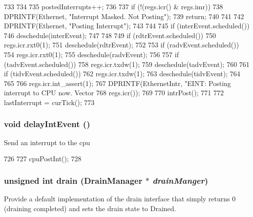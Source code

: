\begin{DoxyCode}
733 {
734 
735     postedInterrupts++;
736 
737     if (!(regs.icr() & regs.imr)) {
738         DPRINTF(Ethernet, "Interrupt Masked. Not Posting\n");
739         return;
740     }
741 
742     DPRINTF(Ethernet, "Posting Interrupt\n");
743 
744 
745     if (interEvent.scheduled()) {
746         deschedule(interEvent);
747     }
748 
749     if (rdtrEvent.scheduled()) {
750         regs.icr.rxt0(1);
751         deschedule(rdtrEvent);
752     }
753     if (radvEvent.scheduled()) {
754         regs.icr.rxt0(1);
755         deschedule(radvEvent);
756     }
757     if (tadvEvent.scheduled()) {
758         regs.icr.txdw(1);
759         deschedule(tadvEvent);
760     }
761     if (tidvEvent.scheduled()) {
762         regs.icr.txdw(1);
763         deschedule(tidvEvent);
764     }
765 
766     regs.icr.int_assert(1);
767     DPRINTF(EthernetIntr, "EINT: Posting interrupt to CPU now. Vector %
768             regs.icr());
769 
770     intrPost();
771 
772     lastInterrupt = curTick();
773 }
\end{DoxyCode}
\hypertarget{classIGbE_a671c460437037741ca81581773939a28}{
\subsubsection[{delayIntEvent}]{\setlength{\rightskip}{0pt plus 5cm}void delayIntEvent ()}}
\label{classIGbE_a671c460437037741ca81581773939a28}
Send an interrupt to the cpu 


\begin{DoxyCode}
726 {
727     cpuPostInt();
728 }
\end{DoxyCode}
\hypertarget{classIGbE_aa8a18d230dba7a674ac8a0b4f35bc36a}{
\subsubsection[{drain}]{\setlength{\rightskip}{0pt plus 5cm}unsigned int drain ({\bf DrainManager} $\ast$ {\em drainManger})}}
\label{classIGbE_aa8a18d230dba7a674ac8a0b4f35bc36a}
Provide a default implementation of the drain interface that simply returns 0 (draining completed) and sets the drain state to Drained. 

